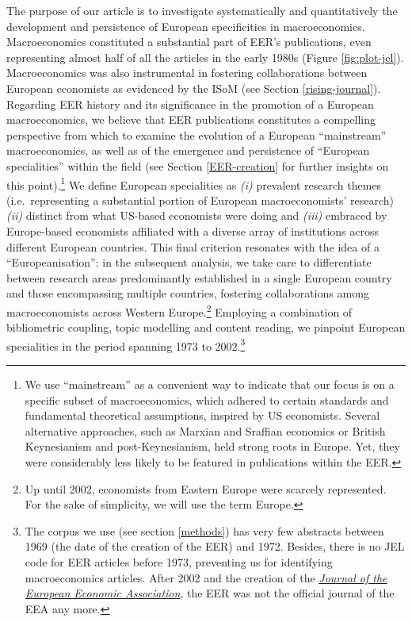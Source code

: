 \documentclass[
  12pt,
  onecolumn]{article}
\begin{document}
The purpose of our article is to investigate systematically and
quantitatively the development and persistence of European specificities
in macroeconomics. Macroeconomics constituted a substantial part of
EER's publications, even representing almost half of all the articles in
the early 1980s (Figure \ref{fig:plot-jel}). Macroeconomics was also
instrumental in fostering collaborations between European economists as
evidenced by the ISoM (see Section \ref{rising-journal}). Regarding EER
history and its significance in the promotion of a European
macroeconomics, we believe that EER publications constitutes a
compelling perspective from which to examine the evolution of a European
``mainstream'' macroeconomics, as well as of the emergence and
persistence of ``European specialities'' within the field (see Section
\ref{EER-creation} for further insights on this point).\footnote{We use
  ``mainstream'' as a convenient way to indicate that our focus is on a
  specific subset of macroeconomics, which adhered to certain standards
  and fundamental theoretical assumptions, inspired by US economists.
  Several alternative approaches, such as Marxian and Sraffian economics
  or British Keynesianism and post-Keynesianism, held strong roots in
  Europe. Yet, they were considerably less likely to be featured in
  publications within the EER.} We define European specialities as
\emph{(i)} prevalent research themes (i.e.~representing a substantial
portion of European macroeconomists' research) \emph{(ii)} distinct from
what US-based economists were doing and \emph{(iii)} embraced by
Europe-based economists affiliated with a diverse array of institutions
across different European countries. This final criterion resonates with
the idea of a ``Europeanisation'': in the subsequent analysis, we take
care to differentiate between research areas predominantly established
in a single European country and those encompassing multiple countries,
fostering collaborations among macroeconomists across Western
Europe.\footnote{Up until 2002, economists from Eastern Europe were
  scarcely represented. For the sake of simplicity, we will use the term
  Europe.} Employing a combination of bibliometric coupling, topic
modelling and content reading, we pinpoint European specialities in the
period spanning 1973 to 2002.\footnote{The corpus we use (see section
  \ref{methods}) has very few abstracts between 1969 (the date of the
  creation of the EER) and 1972. Besides, there is no JEL code for EER
  articles before 1973, preventing us for identifying macroeconomics
  articles. After 2002 and the creation of the
  \href{https://academic.oup.com/jeea}{\emph{Journal of the European
  Economic Association}}, the EER was not the official journal of the
  EEA any more.}
\end{document}
